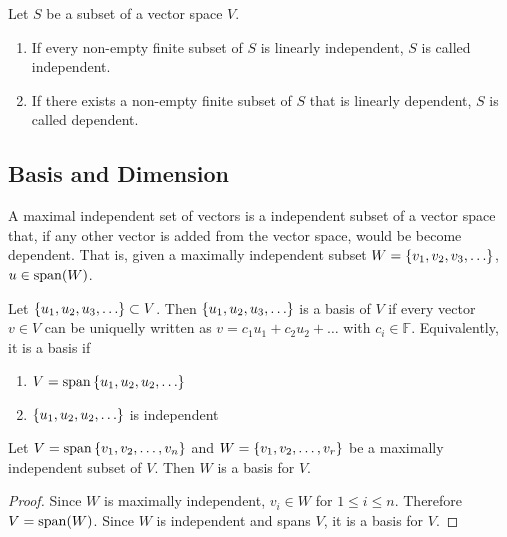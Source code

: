 \documentclass[../notes.tex]{subfiles}
\begin{document}
\begin{definition}
	Let $S$ be a subset of a vector space $V$.
	\begin{enumerate}
		\item If every non-empty finite subset of $S$ is linearly independent, $S$ is called independent.
		\item If there exists a non-empty finite subset of $S$ that is linearly dependent, $S$ is called dependent.
	\end{enumerate}
\end{definition}

\subsection{Basis and Dimension}

\begin{definition}
	A maximal independent set of vectors is a independent subset of a vector space that, if any other vector is added from the vector space, would be become dependent. That is, given a maximally independent subset $W = \qty{v_1, v_2, v_3, \ldots}$, $u \in \operatorname{span}(W)$.
\end{definition}

\begin{definition}[Basis]
	Let $\qty{u_1, u_2, u_3, \ldots} \subset V$. Then $\qty{u_1, u_2, u_3, \ldots}$ is a basis of $V$ if every vector $v \in V$ can be uniquelly written as $v = c_1 u_1 + c_2 u_2 + \ldots$ with $c_i \in \mathbb{F}$. Equivalently, it is a basis if
	\begin{enumerate}
		\item $V = \operatorname{span}\qty{u_1, u_2, u_2, \ldots}$
		\item $\qty{u_1, u_2, u_2, \ldots}$ is independent
	\end{enumerate}
\end{definition}

\begin{theorem}
	Let $V = \operatorname{span}\qty{v_1, v_2, \ldots, v_n}$ and $W = \qty{v_1, v_2, \ldots, v_r}$ be a maximally independent subset of $V$. Then $W$ is a basis for $V$.
\end{theorem}

\begin{proof}
	Since $W$ is maximally independent, $v_i \in W$ for $1 \leq i \leq n$. Therefore $V = \operatorname{span}(W)$. Since $W$ is independent and spans $V$, it is a basis for $V$.
\end{proof}
\end{document}
